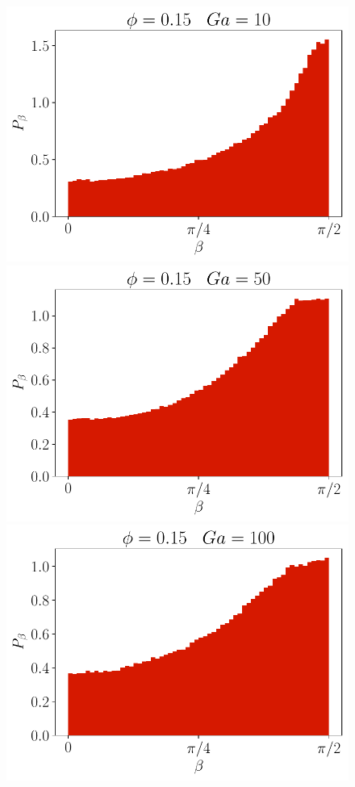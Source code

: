 \begin{figure}[h!]
    \includegraphics[height =\size]{image/N_10/beta/2DMAP_beta_dmin_10_Bo1PHI0_15mu_r0_042Ga10.pdf}
    \includegraphics[height =\size]{image/N_10/beta/2DMAP_beta_dmin_10_Bo1PHI0_15mu_r0_042Ga50.pdf}
    \includegraphics[height =\size]{image/N_10/beta/2DMAP_beta_dmin_10_Bo1PHI0_15mu_r0_042Ga100.pdf}

\end{figure}
